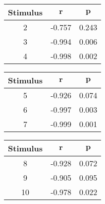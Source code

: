 \begin{tabular}{|c|c|c|}
	\hline
	\bf{Stimulus} & $\boldsymbol{r}$ & $\boldsymbol{p}$ \tabularnewline
	\hline
	\hline
	2 & -0.757 & 0.243 \tabularnewline
	\hline
	3 & -0.994 & 0.006 \tabularnewline
	\hline
	4 & -0.998 & 0.002 \tabularnewline
	\hline
\end{tabular}
\qquad
\begin{tabular}{|c|c|c|}
	\hline
	\bf{Stimulus} & $\boldsymbol{r}$ & $\boldsymbol{p}$ \tabularnewline
	\hline
	\hline
	5 & -0.926 & 0.074 \tabularnewline
	\hline
	6 & -0.997 & 0.003 \tabularnewline
	\hline
	7 & -0.999 & 0.001 \tabularnewline
	\hline
\end{tabular}
\qquad
\begin{tabular}{|c|c|c|}
	\hline
	\bf{Stimulus} & $\boldsymbol{r}$ & $\boldsymbol{p}$ \tabularnewline
	\hline
	\hline
	8 & -0.928 & 0.072 \tabularnewline
	\hline
	9 & -0.905 & 0.095 \tabularnewline
	\hline
	10 & -0.978 & 0.022 \tabularnewline
	\hline
\end{tabular}
